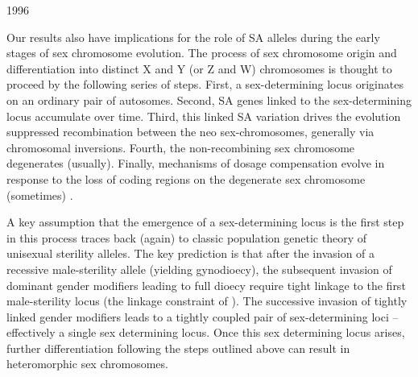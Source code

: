 1996\documentclass[9pt,twocolumn,twoside,lineno]{gsajnl}
\begin{document}
Our results also have implications for the role of SA alleles during the early stages of sex chromosome evolution. The process of sex chromosome origin and differentiation into distinct X and Y (or Z and W) chromosomes is thought to proceed by the following series of steps. First, a sex-determining locus originates on an ordinary pair of autosomes. Second, SA genes linked to the sex-determining locus accumulate over time. Third, this linked SA variation drives the evolution suppressed recombination between the neo sex-chromosomes, generally via chromosomal inversions. Fourth, the non-recombining sex chromosome degenerates (usually). Finally, mechanisms of dosage compensation evolve in response to the loss of coding regions on the degenerate sex chromosome (sometimes) \citep{Rice1987,Charlesworth2002,Bachtrog2006,Qiuetal2013,Bachtrog2014}. 

A key assumption that the emergence of a sex-determining locus is the first step in this process traces back (again) to classic population genetic theory of unisexual sterility alleles. The key prediction is that after the invasion of a recessive male-sterility allele (yielding gynodioecy), the subsequent invasion of dominant gender modifiers leading to full dioecy require tight linkage to the first male-sterility locus (the linkage constraint of \citealt{Charlesworth1978a}). The successive invasion of tightly linked gender modifiers leads to a tightly coupled pair of sex-determining loci -- effectively a single sex determining locus. Once this sex determining locus arises, further differentiation following the steps outlined above can result in heteromorphic sex chromosomes.
\end{document}
